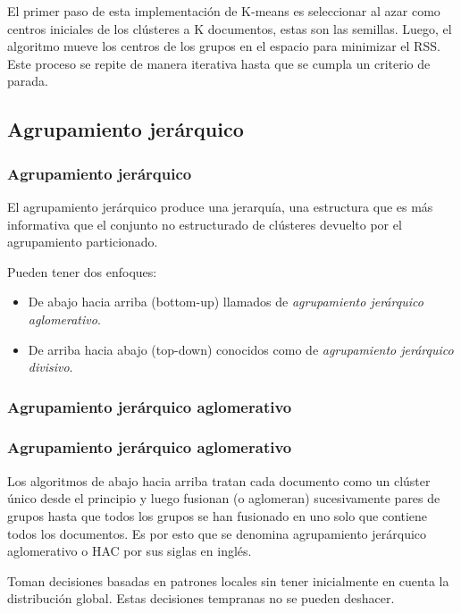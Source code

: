 \documentclass[t,compress,10pt,xcolor=dvipsnames]{beamer}
\begin{document}
{	\vspace{3em}
	El primer paso de esta implementaci\'on de K-means es seleccionar al azar como centros iniciales de los cl\'usteres a K documentos, estas son las semillas. Luego, el algoritmo mueve los centros de los grupos en el espacio para minimizar el RSS. Este proceso se repite de manera iterativa hasta que se cumpla un criterio de parada.
	
}

	\subsection{Agrupamiento jer\'arquico}
	\frame
	{
		\frametitle{Agrupamiento jer\'arquico}
		\vspace{2em}
		El agrupamiento jerárquico produce una jerarquía, una estructura que es más informativa que el conjunto no estructurado de clústeres devuelto por el agrupamiento particionado.
		
		\vspace{1em}
		Pueden tener dos enfoques: 
		\begin{itemize}
			\item De abajo hacia arriba (bottom-up) llamados de \textit{agrupamiento jer\'arquico aglomerativo}. 
			\item De arriba hacia abajo (top-down) conocidos como de \textit{agrupamiento jer\'arquico divisivo}. 
		\end{itemize}
	}
	
	
	\subsubsection{Agrupamiento jer\'arquico aglomerativo}
	\frame
	{
		\frametitle{Agrupamiento jer\'arquico aglomerativo}
		\vspace{3em}
		Los algoritmos de abajo hacia arriba tratan cada documento como un clúster único desde el principio y luego fusionan (o aglomeran) sucesivamente pares de grupos hasta que todos los grupos se han fusionado en uno solo que contiene todos los documentos. 
		Es por esto que se denomina agrupamiento jerárquico aglomerativo o HAC por sus siglas en ingl\'es. 
		
		\vspace{1em}
		Toman decisiones basadas en patrones locales sin tener inicialmente en cuenta la distribución global. Estas decisiones tempranas no se pueden deshacer.
	}
\end{document}
